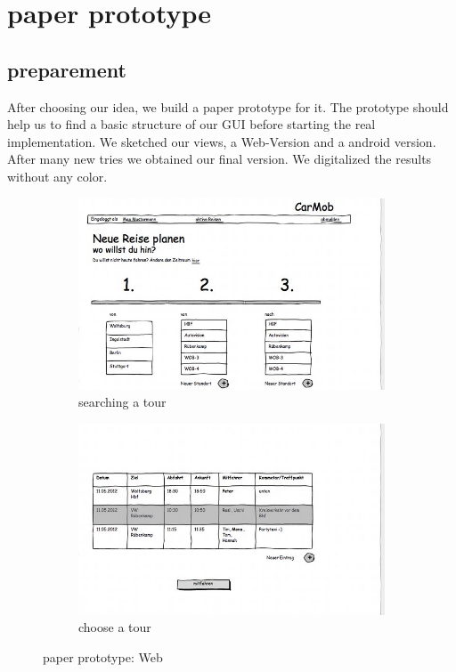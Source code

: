 
\section{paper prototype}

\subsection{preparement}

After choosing our idea, we build a paper prototype for it. The prototype should help us to find a basic structure of our GUI
before starting the real implementation. We sketched our views, a Web-Version and a android version. After many new tries we
obtained our final version. We digitalized the results without any color.

\begin{figure}[!h]
	\begin{subfigure}[b]{0.5\textwidth}
		\centering
		\includegraphics[width=\textwidth]{images/Web_1.jpg}
		\caption{searching a tour}
		\label{fig:web1}
	\end{subfigure}
	\begin{subfigure}[b]{0.5\textwidth}
		\centering
		\includegraphics[width=\textwidth]{images/Web_2.jpg}
		\caption{choose a tour}
		\label{fig:web2}
	\end{subfigure}
	\caption{paper prototype: Web}
	\label{fig:web}
\end{figure}

